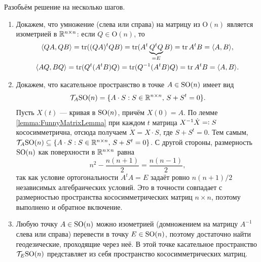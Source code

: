 \begin{solution}
	Разобьём решение на несколько шагов.
	\begin{enumerate}[nolistsep, label=(\arabic*)]
		\item Докажем, что умножение (слева или справа) на матрицу из $\mathrm{O}(n)$ является изометрией в $\mathbb{R}^{n \times n}$: если $Q \in \mathrm{O}(n)$, то
			\begin{gather*}
				\langle QA, QB\rangle = \operatorname{tr}((QA)^tQB) = \operatorname{tr}(A^t\underbrace{Q^tQ}_{= E}B) = \operatorname{tr} A^tB = \langle A, B\rangle,\\
				\langle AQ, BQ\rangle = \operatorname{tr}(Q^t(A^tB)Q) = \operatorname{tr}(Q^{-1}(A^tB)Q) = \operatorname{tr}{A^tB} = \langle A, B\rangle.
			\end{gather*}
		\item Докажем, что касательное пространство в точке $A \in \mathrm{SO}(n)$ имеет вид
			\[
				\mathcal{T}_A\mathrm{SO}(n) = \{A \cdot S : S \in \mathbb{R}^{n \times n},\,S + S^t = 0\}.
			\]
			Пусть $X(t)$ --- кривая в $\mathrm{SO}(n)$, причём $X(0) = A$. По лемме \ref{lemma:FunnyMatrixLemma} при каждом $t$ матрица $X^{-1}\dot{X} = \vcentcolon S$ кососимметрична, отсюда получаем $\dot{X} = X \cdot S$, где $S + S^t = 0$. Тем самым, $\mathcal{T}_A\mathrm{SO}(n) \subseteq \{A \cdot S : S \in \mathbb{R}^{n \times n},\,S + S^t = 0\}$. С другой стороны, размерность $\mathrm{SO}(n)$ как поверхности в $\mathbb{R}^{n \times n}$ равна
			\[
				n^2 - \frac{n(n + 1)}{2} = \frac{n(n - 1)}{2},
			\]
			так как условие ортогональности $A^tA = E$ задаёт ровно $n(n + 1) / 2$ независимых алгебраических условий. Это в точности совпадает с размерностью пространства кососимметрических матриц $n \times n$, поэтому выполнено и обратное включение.
		\item Любую точку $A \in \mathrm{SO}(n)$ можно изометрией (домножением на матрицу $A^{-1}$ слева или справа) перевести в точку $E \in \mathrm{SO}(n)$, поэтому достаточно найти геодезические, проходящие через неё. В этой точке касательное пространство $\mathcal{T}_E\mathrm{SO}(n)$ представляет из себя пространство кососимметрических матриц.


\end{enumerate}
\end{solution}
